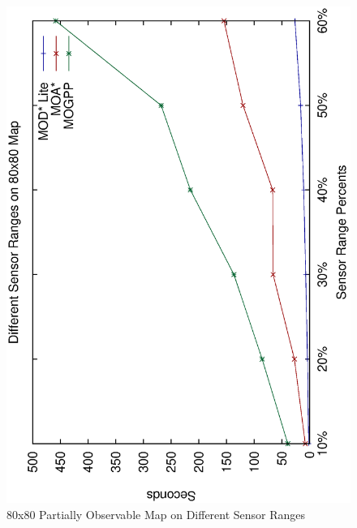 \documentclass[10pt,journal]{IEEEtran}
\begin{document}
\begin{figure}
\centering
\includegraphics[scale=0.3]{experimental/80x80_partially_normal}
\caption{80x80 Partially Observable Map on Different Sensor Ranges}
\label{fig:80x80sensor}
\end{figure}
\end{document}
